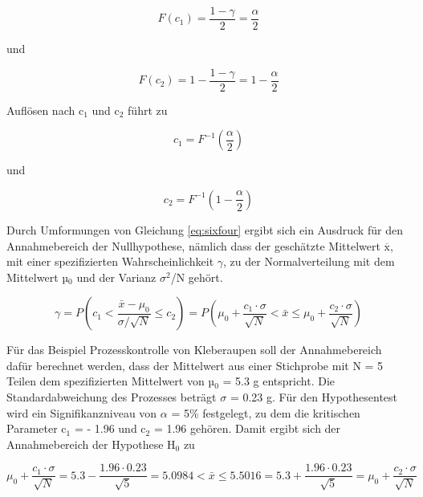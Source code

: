 \begin{equation}\label{eq:sixfive}
F(c_{1})=\dfrac{1-\gamma}{2} =\dfrac{\alpha}{2}
\end{equation}

\noindent und

\begin{equation}\label{eq:sixsix}
F(c_{2})=1-\dfrac{1-\gamma}{2} =1-\dfrac{\alpha}{2}
\end{equation}

\noindent Aufl\"{o}sen nach c$_{1}$ und c$_{2}$ f\"{u}hrt zu

\begin{equation}\label{eq:sixseven}
c_{1} =F^{-1} \left(\dfrac{\alpha }{2} \right)
\end{equation}

\noindent und

\begin{equation}\label{eq:sixeight}
c_{2} =F^{-1} \left(1-\dfrac{\alpha }{2} \right)
\end{equation}

\noindent Durch Umformungen von Gleichung \eqref{eq:sixfour} ergibt sich ein Ausdruck f\"{u}r den Annahmebereich der Nullhypothese, n\"{a}mlich dass der gesch\"{a}tzte Mittelwert $\overline{\mathrm{x}}$, mit einer spezifizierten Wahrscheinlichkeit $\gamma$, zu der Normalverteilung mit dem Mittelwert µ$_{0}$ und der Varianz $\sigma^{2}$/N geh\"{o}rt.

\begin{equation}\label{eq:sixnine}
\gamma =P\left(c_{1} <\dfrac{\bar{x}-\mu _{0} }{\sigma /\sqrt{N}} \le c_{2} \right)=P\left(\mu _{0} +\dfrac{c_{1} \cdot \sigma }{\sqrt{N}} <\bar{x}\le \mu _{0} +\dfrac{c_{2} \cdot \sigma }{\sqrt{N}} \right)
\end{equation}

\noindent F\"{u}r das Beispiel Prozesskontrolle von Kleberaupen soll der Annahmebereich daf\"{u}r berechnet werden, dass der Mittelwert aus einer Stichprobe mit N = 5 Teilen dem spezifizierten Mittelwert von µ$_{0}$ = 5.3 g entspricht. Die Standardabweichung des Prozesses betr\"{a}gt $\sigma$ = 0.23 g. F\"{u}r den Hypothesentest wird ein Signifikanzniveau von $\alpha$ = 5\% festgelegt, zu dem die kritischen Parameter c$_{1}$ = - 1.96 und c$_{2}$ = 1.96 geh\"{o}ren. Damit ergibt sich der Annahmebereich der Hypothese H$_{0}$ zu

\begin{equation}\label{eq:sixten}
\mu _{0} +\dfrac{c_{1} \cdot \sigma }{\sqrt{N} } =5.3-\dfrac{1.96\cdot 0.23}{\sqrt{5} } =5.0984<\bar{x}\le 5.5016=5.3+\dfrac{1.96\cdot 0.23}{\sqrt{5} } =\mu _{0} +\dfrac{c_{2} \cdot \sigma }{\sqrt{N} }
\end{equation}

